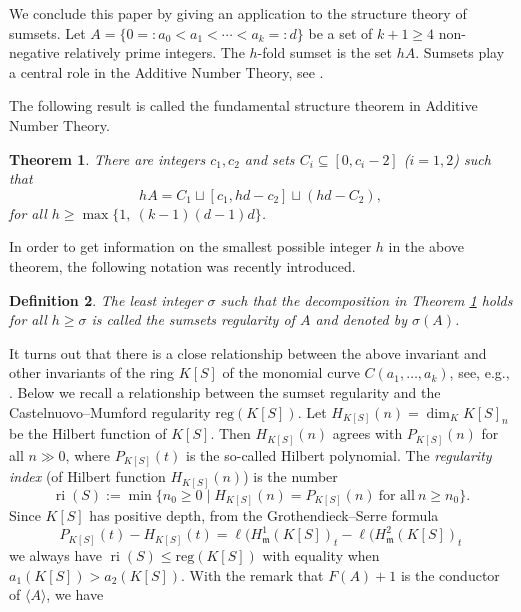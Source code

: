 \documentclass[11pt]{article}
\newtheorem{Theorem}{Theorem}[section]
\newtheorem{Definition}[Theorem]{Definition}
\def\reg{\mathrm{reg}}
\def\ri{\operatorname{ri}}
\def\mfr{{\frak m}}
\def\mfr{{\mathfrak m}}
\theoremstyle{remark}
\theoremstyle{definition}
\begin{document}
We conclude this paper by giving an application to the structure theory of sumsets. Let $A = \{0=: a_0 < a_1< \cdots < a_k =:d\}$  be a set of $k+1 \geq 4$  non-negative
relatively prime integers.  The $h$-fold sumset  is the set $hA$.  Sumsets play a central role in the Additive Number Theory, see \cite{Na}. 

The following result is called the fundamental structure theorem in Additive Number Theory.


\begin{Theorem}
 {\rm \cite[Theorem 1.1]{Na}} \label{NaTh11}  There are integers $c_1, c_2$  and sets $C_i \subseteq [ 0, c_i-2]$ ($i=1,2$)  such that
$$hA = C_1 \sqcup [c_1,  h d - c_2] \sqcup (h d- C_2),$$
for all $h\ge \max\{1,\ (k-1)(d - 1)d \}$.
\end{Theorem}

In order to get information on the smallest possible integer $h$  in the above theorem, the following notation was recently introduced.

\begin{Definition}
{\rm \cite[Definition 1.3]{GS} \label{Sumreg} The least integer $\sigma$ such that the decomposition in Theorem \ref{NaTh11} holds for all $h\ge \sigma$ is called the {\it sumsets regularity} of  $A$  and  denoted  by $\sigma(A)$.}
 \end{Definition}
 
 It turns out that there is a close relationship between the above invariant and other invariants of the ring $K[S]$ of the monomial curve $C(a_1,\ldots,a_k)$, see, e.g.,  \cite{El}. Below we recall a relationship between the sumset regularity and the Castelnuovo--Mumford regularity $\reg(K[S])$.  
 Let $H_{K[S]}(n) = \dim_K K[S]_n$  be the Hilbert function of $K[S]$. Then $H_{K[S]} (n)$ agrees with $P_{K[S]}(n)$ for all $n\gg 0$, where $P_{K[S]}(t)$ is the so-called  Hilbert polynomial. The {\it regularity index} (of Hilbert function $H_{K[S]} (n)$) is the number
 $$\ri (S) := \min\{ n_0 \geq 0\mid H_{K[S]} (n) = P_{K[S]} (n) \ \text{for all}\ n\geq n_0 \}.$$
 Since $K[S]$ has positive depth, from the Grothendieck--Serre  formula
$$ P_{K[S]}(t) - H_{K[S]}(t) =  \ell(H^1_{\mfr}(K[S])_t -  \ell(H^2_{\mfr}(K[S])_t $$
we always have $\ri(S) \leq \reg(K[S])$ with equality when $a_1(K[S]) >  a_2(K[S])$. With the remark that $F(A) + 1$ is the conductor of $\langle A\rangle$, we have 
 
\end{document}
